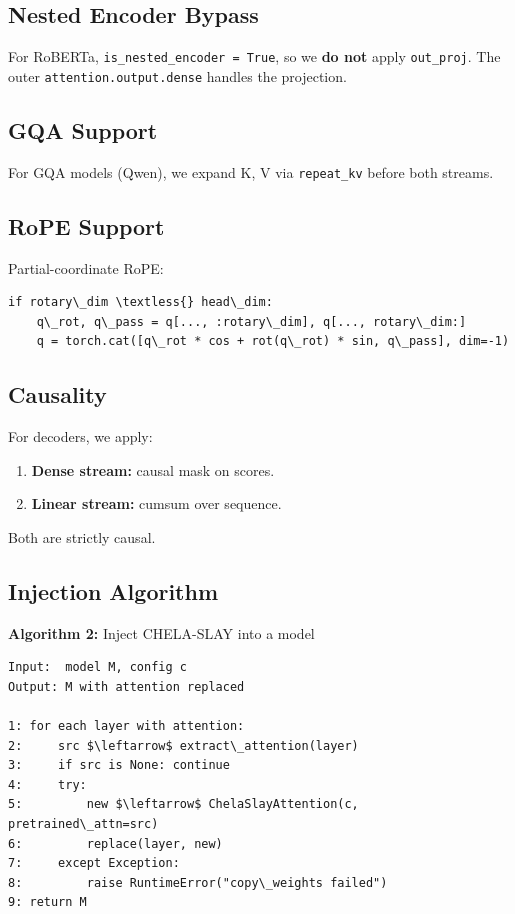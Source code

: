 \subsection{Nested Encoder Bypass}

For RoBERTa, \texttt{is\_nested\_encoder = True}, so we \textbf{do not} apply \texttt{out\_proj}. 
The outer \texttt{attention.output.dense} handles the projection.

\subsection{GQA Support}

For GQA models (Qwen), we expand K, V via \texttt{repeat\_kv} before both streams.

\subsection{RoPE Support}

Partial-coordinate RoPE:

\begin{lstlisting}
if rotary\_dim \textless{} head\_dim:
    q\_rot, q\_pass = q[..., :rotary\_dim], q[..., rotary\_dim:]
    q = torch.cat([q\_rot * cos + rot(q\_rot) * sin, q\_pass], dim=-1)
\end{lstlisting}

\subsection{Causality}

For decoders, we apply:

\begin{enumerate}
\item \textbf{Dense stream:} causal mask on scores.
\item \textbf{Linear stream:} cumsum over sequence.

\end{enumerate}
Both are strictly causal.

\subsection{Injection Algorithm}

\textbf{Algorithm 2:} Inject CHELA-SLAY into a model
\begin{lstlisting}
Input:  model M, config c
Output: M with attention replaced

1: for each layer with attention:
2:     src $\leftarrow$ extract\_attention(layer)
3:     if src is None: continue
4:     try:
5:         new $\leftarrow$ ChelaSlayAttention(c, pretrained\_attn=src)
6:         replace(layer, new)
7:     except Exception:
8:         raise RuntimeError("copy\_weights failed")
9: return M
\end{lstlisting}

